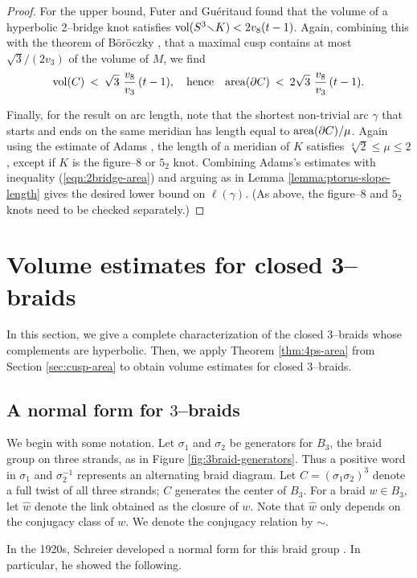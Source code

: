 \documentclass[11pt]{amsart}
\renewcommand{\setminus}{{\smallsetminus}}
\newcommand{\vol}{{\rm vol}}
\newcommand{\area}{{\rm area}}
\newcommand{\bdy}{{\partial}}
\theoremstyle{plain}
\theoremstyle{definition}
\begin{document}
\begin{proof}
For the upper bound, Futer and Gu\'eritaud \cite[Theorem
B.3]{gf:two-bridge} found that the volume of a hyperbolic 2--bridge
knot satisfies $\vol(S^3\setminus K) < 2v_8(t-1)$.  Again, combining
this with the theorem of B{\"o}r{\"o}czky \cite[Theorem 4]{boroczky},
that a maximal cusp contains at most $\sqrt{3}/(2v_3)$ of the volume
of $M$, we find
$$\vol(C) \: < \: \sqrt{3}\,\, \frac{v_8}{v_3}\,(t-1), \quad
\mbox{hence} \quad \area(\bdy C) \:<\: 2 \sqrt{3}\,\,
\frac{v_8}{v_3}\,(t-1).$$

Finally, for the result on arc length, note that the shortest non-trivial arc
$\gamma$ that starts and ends on the same meridian has length equal to
$\area(\bdy C)/\mu$.  Again using the estimate of Adams
\cite{adams:waist2, adams:2-gen}, the length of a meridian of $K$
satisfies $\sqrt[4]{2} \leq \mu \leq 2$, except if $K$ is the
figure--8 or $5_2$ knot.  Combining Adams's estimates with inequality
(\ref{eqn:2bridge-area}) and arguing as in Lemma
\ref{lemma:ptorus-slope-length} gives the desired lower bound on
$\ell(\gamma)$.  (As above, the figure--8 and $5_2$ knots need to be
checked separately.)
\end{proof}


\section{Volume estimates for closed 3--braids}\label{sec:volume3braids}

In this section, we give a complete characterization of the closed
$3$--braids whose complements are hyperbolic.  Then, we apply Theorem
\ref{thm:4ps-area} from Section \ref{sec:cusp-area} to obtain volume
estimates for closed $3$--braids.

\subsection{A normal form for $3$--braids}
We begin with some notation.  Let $\sigma_1$ and $\sigma_2$ be
generators for $B_3$, the braid group on three strands, as in Figure
\ref{fig:3braid-generators}.  Thus a positive word in $\sigma_1$ and
$\sigma_2^{-1}$ represents an alternating braid diagram.  Let $C =
(\sigma_1 \sigma_2)^3$ denote a full twist of all three strands; $C$
generates the center of $B_3$.  For a braid $w \in B_3$, let $\hat{w}$
denote the link obtained as the closure of $w$.  Note that $\hat{w}$
only depends on the conjugacy class of $w$.  We denote the conjugacy
relation by $\sim$.

In the 1920s, Schreier developed a normal form for this braid group
\cite{schreier}. In particular, he showed the following.
\end{document}

